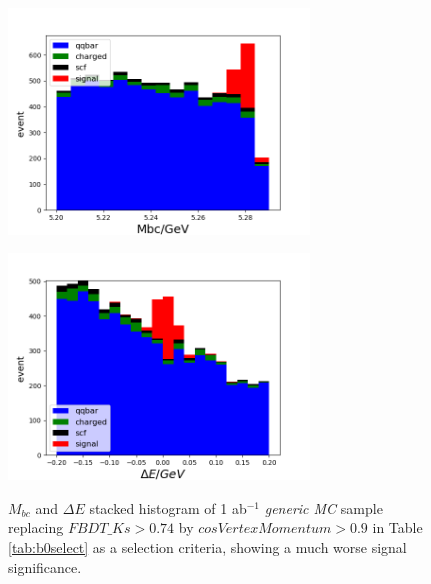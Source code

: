 \begin{figure}[htbp]
	\begin{minipage}[b]{0.5\linewidth}
		\centering 
		\includegraphics[height=6cm]{figures/hist_stacked_generic_mbc_noksfinder.png}
		\label{}
	\end{minipage}
	\begin{minipage}[b]{0.5\linewidth}
		\centering 
		\includegraphics[height=6cm]{figures/hist_stacked_generic_dE_noksfinder.png}
		\label{}
	\end{minipage}
	\caption{$M_{bc}$ and $\Delta E$ stacked histogram of  1 ab$^{-1}$ \textit{generic MC} sample replacing $FBDT\_Ks>0.74$ by ${cosVertexMomentum}>0.9$ in Table \ref{tab:b0select} as a selection criteria, showing a much worse signal significance.}
	\label{fig:hist_2D_highBG}
\end{figure}





